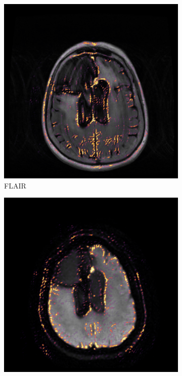 \begin{figure}[htbp]
    \begin{subfigure}[t]{\figexamplewidth}
        \centering
        \includegraphics[trim={0.5cm 0cm 0.5cm 1cm}, clip,width=\textwidth]{Figures/FLAIR_saliency}
        \caption{\gls{FLAIR}}\label{fig:FLAIRCam}
    \end{subfigure}
    \begin{subfigure}[t]{\figexamplewidth}
        \centering
        \includegraphics[trim={0.5cm 0cm 0.5cm 1cm}, clip,width=\textwidth]{Figures/DWI_saliency}

\end{subfigure}
\end{figure}
